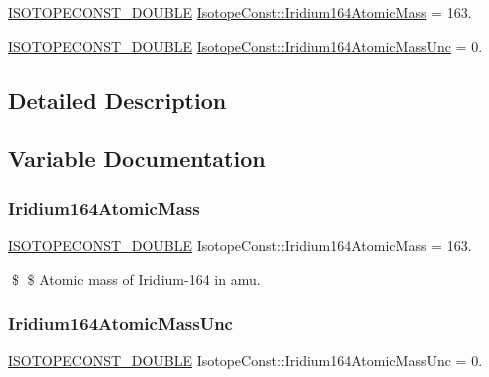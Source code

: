 \begin{DoxyCompactItemize}
\item 
\mbox{\hyperlink{group___isotope_const-_macros_ga8f45a7272ce02c0b4c65c44636ed719a}{I\+S\+O\+T\+O\+P\+E\+C\+O\+N\+S\+T\+\_\+\+D\+O\+U\+B\+LE}} \mbox{\hyperlink{group___isotope_const-_iridium-_ir164_ga60703ba88b04b18f992d5f2f507d4d4c}{Isotope\+Const\+::\+Iridium164\+Atomic\+Mass}} = 163.
\item 
\mbox{\hyperlink{group___isotope_const-_macros_ga8f45a7272ce02c0b4c65c44636ed719a}{I\+S\+O\+T\+O\+P\+E\+C\+O\+N\+S\+T\+\_\+\+D\+O\+U\+B\+LE}} \mbox{\hyperlink{group___isotope_const-_iridium-_ir164_ga521eedcfe52692a1b993de1b7fb91c2f}{Isotope\+Const\+::\+Iridium164\+Atomic\+Mass\+Unc}} = 0.
\end{DoxyCompactItemize}


\subsection{Detailed Description}


\subsection{Variable Documentation}
\mbox{\label{group___isotope_const-_iridium-_ir164_ga60703ba88b04b18f992d5f2f507d4d4c}} 
\subsubsection{\texorpdfstring{Iridium164\+Atomic\+Mass}{Iridium164AtomicMass}}
{\footnotesize\ttfamily \mbox{\hyperlink{group___isotope_const-_macros_ga8f45a7272ce02c0b4c65c44636ed719a}{I\+S\+O\+T\+O\+P\+E\+C\+O\+N\+S\+T\+\_\+\+D\+O\+U\+B\+LE}} Isotope\+Const\+::\+Iridium164\+Atomic\+Mass = 163.}

\$ \$ Atomic mass of Iridium-\/164 in amu. \mbox{\label{group___isotope_const-_iridium-_ir164_ga521eedcfe52692a1b993de1b7fb91c2f}} 
\subsubsection{\texorpdfstring{Iridium164\+Atomic\+Mass\+Unc}{Iridium164AtomicMassUnc}}
{\footnotesize\ttfamily \mbox{\hyperlink{group___isotope_const-_macros_ga8f45a7272ce02c0b4c65c44636ed719a}{I\+S\+O\+T\+O\+P\+E\+C\+O\+N\+S\+T\+\_\+\+D\+O\+U\+B\+LE}} Isotope\+Const\+::\+Iridium164\+Atomic\+Mass\+Unc = 0.}

